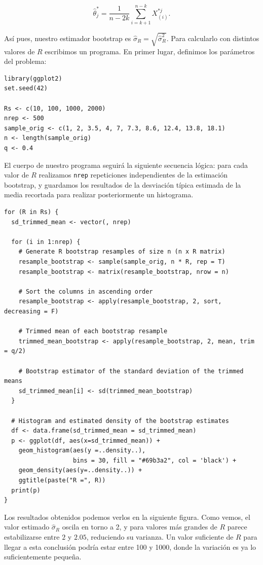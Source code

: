 \documentclass[12pt]{article}
\begin{document}
\[
\hat\theta^*_j = \frac{1}{n-2k} \sum_{i=k+1}^{n-k} X_{(i)}^{*j}.
\]

Así pues, nuestro estimador bootstrap es $\hat\sigma_R=\sqrt{\hat\sigma_R^2}$. Para calcularlo con distintos valores de $R$ escribimos un programa. En primer lugar, definimos los parámetros del problema:

\begin{verbatim}
library(ggplot2)
set.seed(42)

Rs <- c(10, 100, 1000, 2000)
nrep <- 500
sample_orig <- c(1, 2, 3.5, 4, 7, 7.3, 8.6, 12.4, 13.8, 18.1)
n <- length(sample_orig)
q <- 0.4
\end{verbatim}

El cuerpo de nuestro programa seguirá la siguiente secuencia lógica: para cada valor de $R$ realizamos \verb|nrep| repeticiones independientes de la estimación bootstrap, y guardamos los resultados de la desviación típica estimada de la media recortada para realizar posteriormente un histograma.

\begin{verbatim}
for (R in Rs) {
  sd_trimmed_mean <- vector(, nrep)

  for (i in 1:nrep) {
    # Generate R bootstrap resamples of size n (n x R matrix)
    resample_bootstrap <- sample(sample_orig, n * R, rep = T)
    resample_bootstrap <- matrix(resample_bootstrap, nrow = n)

    # Sort the columns in ascending order
    resample_bootstrap <- apply(resample_bootstrap, 2, sort, decreasing = F)

    # Trimmed mean of each bootstrap resample
    trimmed_mean_bootstrap <- apply(resample_bootstrap, 2, mean, trim = q/2)

    # Bootstrap estimator of the standard deviation of the trimmed means
    sd_trimmed_mean[i] <- sd(trimmed_mean_bootstrap)
  }

  # Histogram and estimated density of the bootstrap estimates
  df <- data.frame(sd_trimmed_mean = sd_trimmed_mean)
  p <- ggplot(df, aes(x=sd_trimmed_mean)) +
    geom_histogram(aes(y =..density..),
                   bins = 30, fill = "#69b3a2", col = 'black') +
    geom_density(aes(y=..density..)) +
    ggtitle(paste("R =", R))
  print(p)
}
\end{verbatim}

Los resultados obtenidos podemos verlos en la siguiente figura. Como vemos, el valor estimado $\hat\sigma_R$ oscila en torno a 2, y para valores más grandes de $R$ parece estabilizarse entre $2$ y $2.05$, reduciendo su varianza. Un valor suficiente de $R$ para llegar a esta conclusión podría estar entre 100 y 1000, donde la variación es ya lo suficientemente pequeña.
\end{document}
